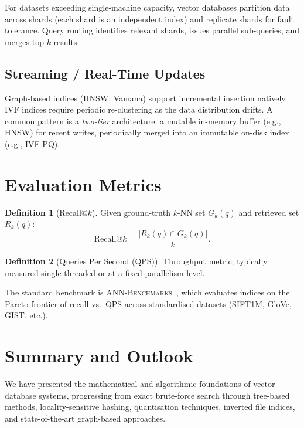 \documentclass[11pt,a4paper]{article}
\theoremstyle{definition}
\newtheorem{definition}{Definition}[section]
\begin{document}
For datasets exceeding single-machine capacity, vector databases
partition data across shards (each shard is an independent index) and
replicate shards for fault tolerance.  Query routing identifies relevant
shards, issues parallel sub-queries, and merges top-$k$ results.

\subsection{Streaming / Real-Time Updates}

Graph-based indices (HNSW, Vamana) support incremental insertion
natively.  IVF indices require periodic re-clustering as the data
distribution drifts.  A common pattern is a \emph{two-tier} architecture:
a mutable in-memory buffer (e.g., HNSW) for recent writes, periodically
merged into an immutable on-disk index (e.g., IVF-PQ).


\section{Evaluation Metrics}\label{sec:eval}

\begin{definition}[Recall@$k$]
Given ground-truth $k$-NN set $G_k(q)$ and retrieved set $R_k(q)$:
\[
  \mathrm{Recall@}k = \frac{|R_k(q) \cap G_k(q)|}{k}.
\]
\end{definition}

\begin{definition}[Queries Per Second (QPS)]
Throughput metric; typically measured single-threaded or at a fixed
parallelism level.
\end{definition}

The standard benchmark is \textsc{ANN-Benchmarks}~\cite{aumuller2020annbenchmarks}, which evaluates indices on the Pareto frontier of recall vs.\ QPS
across standardised datasets (SIFT1M, GloVe, GIST, etc.).


\section{Summary and Outlook}

We have presented the mathematical and algorithmic foundations of vector
database systems, progressing from exact brute-force search through
tree-based methods, locality-sensitive hashing, quantisation techniques,
inverted file indices, and state-of-the-art graph-based approaches.
\end{document}
